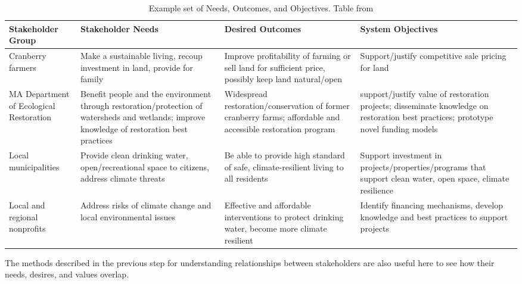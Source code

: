 \begin{table}[!htb]
\caption[Example Set of Needs, Outcomes, and Objectives]{Example set of Needs, Outcomes, and Objectives. Table from \cite{jaffeEnvironmentalEconomicSystems2022}}
\label{tab:need-outcome-objective}
\begin{center}
\scriptsize
\begin{tabular}{ L{1.75cm} | L{3.55cm} | L{3.55cm} | L{3.55cm} } \hline

\textbf{Stakeholder Group} & \textbf{Stakeholder Needs} & \textbf{Desired Outcomes} & \textbf{System Objectives} \\ \hline

Cranberry farmers & Make a sustainable living, recoup investment in land, provide for family & Improve profitability of farming or sell land for sufficient price, possibly keep land natural/open & Support/justify competitive sale pricing for land \\ \hline

MA Department of Ecological Restoration & Benefit people and the environment through restoration/protection of watersheds and wetlands; improve knowledge of restoration best practices & Widespread restoration/conservation of former cranberry farms; affordable and accessible restoration program & support/justify value of restoration projects; disseminate knowledge on restoration best practices; prototype novel funding models \\ \hline

Local municipalities & Provide clean drinking water, open/recreational space to citizens, address climate threats & Be able to provide high standard of safe, climate-resilient living to all residents & Support investment in projects/properties/programs that support clean water, open space, climate resilience \\ \hline

Local and regional nonprofits & Address risks of climate change and local environmental issues & Effective and affordable interventions to protect drinking water, become more climate resilient & Identify financing mechanisms, develop knowledge and best practices to support projects \\ \hline 

\end{tabular}
\end{center}
\end{table}

The methods described in the previous step for understanding relationships between stakeholders are also useful here to see how their needs, desires, and values overlap.

